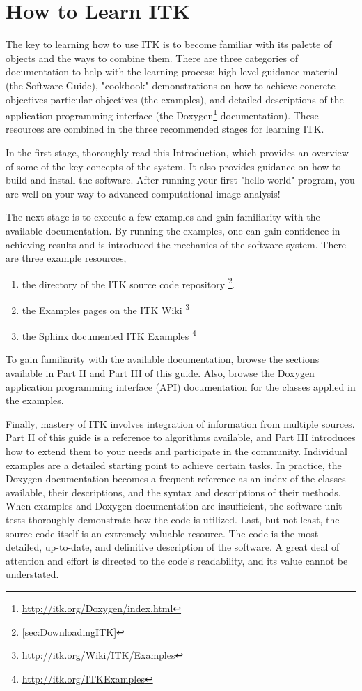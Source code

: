 \section{How to Learn ITK}
\label{sec:HowToLearnITK}

The key to learning how to use ITK is to become familiar with its palette of
objects and the ways to combine them. There are three categories of
documentation to help with the learning process: high level guidance material
(the Software Guide), "cookbook" demonstrations on how to achieve concrete objectives
particular objectives (the examples), and detailed descriptions of the
application programming interface (the
Doxygen\footnote{\url{http://itk.org/Doxygen/index.html}} documentation). These
resources are combined in the three recommended stages for learning ITK.

In the first stage, thoroughly read this Introduction, which provides an
overview of some of the key concepts of the system. It also provides guidance
on how to build and install the software. After running your first "hello
world" program, you are well on your way to advanced computational image
analysis!

The next stage is to execute a few examples and gain familiarity with the
available documentation.  By running the examples, one can gain confidence
in achieving results and is introduced the mechanics of the software system.
There are three example resources,
\begin{enumerate}
  \item	the  directory of the ITK source code repository \footnote{\ref{sec:DownloadingITK}}.
  \item the Examples pages on the ITK Wiki \footnote{\url{http://itk.org/Wiki/ITK/Examples}}
  \item	the Sphinx documented ITK Examples \footnote{\url{http://itk.org/ITKExamples}}
\end{enumerate}
To gain familiarity with the available documentation, browse the sections
available in Part II and Part III of this guide. Also, browse the Doxygen
application programming interface (API) documentation for the classes applied
in the examples.

Finally, mastery of ITK involves integration of information from multiple
sources. Part II of this guide is a reference to algorithms available, and
Part III introduces how to extend them to your needs and participate in the
community. Individual examples are a detailed starting point to achieve
certain tasks.  In practice, the Doxygen documentation becomes a frequent
reference as an index of the classes available, their descriptions, and the
syntax and descriptions of their methods.  When examples and Doxygen
documentation are insufficient, the software unit tests thoroughly demonstrate
how the code is utilized. Last, but not least, the source code itself
is an extremely valuable resource. The code is the most detailed, up-to-date, and
definitive description of the software. A great deal of attention and effort
is directed to the code's readability, and its value cannot be understated.

